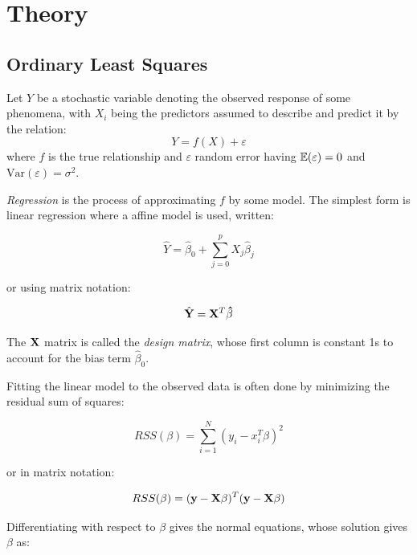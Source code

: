 \section{Theory}\label{sec:Theory}

\subsection{Ordinary Least Squares}\label{subsec:OLS}

Let \(Y\) be a stochastic variable denoting the observed response of some
phenomena, with \(X_{i}\) being the predictors assumed to describe and predict
it by the relation:
\begin{equation*}
  Y = f(X) + \varepsilon
\end{equation*}
where \(f\) is the true relationship and \(\varepsilon\) random error
having \(\operatorname{\mathbb{E}}(\varepsilon) = 0\) and \(\text{Var}(\varepsilon) = \sigma^{2}\).

\textit{Regression} is the process of approximating \(f\)
by some model. The simplest form is linear regression where a affine model is
used, written:

\begin{equation*}
  \hat{Y} = \hat\beta_{0} + \sum_{j=0}^{p}X_{j}\hat\beta_{j}
\end{equation*}

or using matrix notation:

\begin{equation*}
  \hat{\vb{Y}} = \vb{X}^{T}\mathbf{\hat{\beta}}
\end{equation*}

The \(\vb{X}\) matrix is called the \textit{design matrix}, whose first column is
constant 1s to account for the bias term \(\hat\beta_{0}\).

Fitting the linear model to the observed data is often done by minimizing the
residual sum of squares:

\begin{equation*}
  RSS(\beta) = \sum_{i=1}^{N} \left( y_{i} - x_{i}^{T}\beta \right)^{2}
\end{equation*}

or in matrix notation:

\begin{equation*}
  RSS(\beta) = (\vb{y} - \vb{X}\beta)^{T}(\vb{y} - \vb{X}\beta)
\end{equation*}

Differentiating with respect to \(\beta\) gives the normal equations, whose
solution gives \(\beta\) as:

